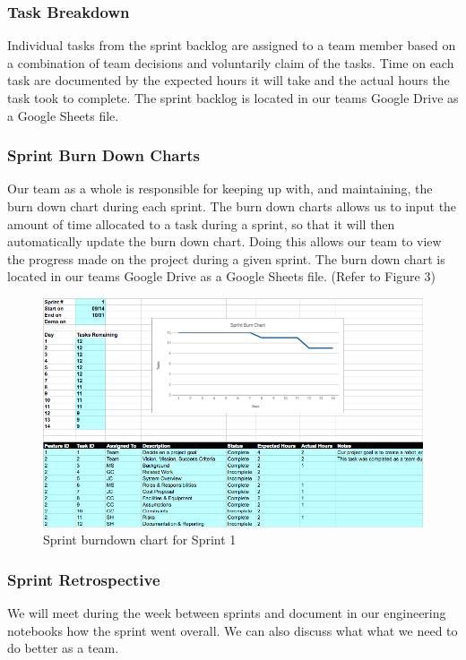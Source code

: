 \subsubsection{Task Breakdown}
Individual tasks from the sprint backlog are assigned to a team member based on a combination of team decisions and voluntarily claim of the tasks. Time on each task are documented by the expected hours it will take and the actual hours the task took to complete. The sprint backlog is located in our teams Google Drive as a Google Sheets file.

\subsubsection{Sprint Burn Down Charts}
Our team as a whole is responsible for keeping up with, and maintaining, the burn down chart during each sprint. The burn down charts allows us to input the amount of time allocated to a task during a sprint, so that it will then automatically update the burn down chart. Doing this allows our team to view the progress made on the project during a given sprint. The burn down chart is located in our teams Google Drive as a Google Sheets file. (Refer to Figure 3)

\begin{figure}[ht]
    \centering
    \includegraphics[width=1.0\textwidth]{images/sprint_burndown.png}
    \caption{Sprint burndown chart for Sprint 1}
\end{figure}

\subsubsection{Sprint Retrospective}
We will meet during the week between sprints and document in our engineering notebooks how the sprint went overall. We can also discuss what what we need to do better as a team.

